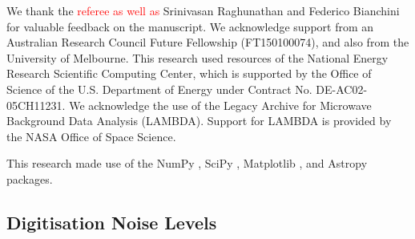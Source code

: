 \documentclass[apj]{emulateapj}
\newcommand{\changed}[1]{\textcolor{Red}{#1}}
\begin{document}

We thank the \changed{referee as well as} Srinivasan Raghunathan and Federico Bianchini for valuable feedback on the manuscript. 
We acknowledge support from an Australian Research Council Future Fellowship (FT150100074), and also from the University of Melbourne. 
This research used resources of the National Energy Research Scientific Computing Center, which is supported by the Office of Science of the U.S. Department of Energy under Contract No. DE-AC02-05CH11231. 
We acknowledge the use of the Legacy Archive for Microwave Background Data Analysis (LAMBDA). Support for LAMBDA is provided by the NASA Office of Space Science.


This research made use of the NumPy \citep{numpy}, SciPy \citep{scipy}, Matplotlib \citep{matplotlib}, and Astropy \citep{astropy} packages.

\newpage

\appendix

\subsection{Digitisation Noise Levels}
\label{subsec:appendixnoisetables}
\end{document}
